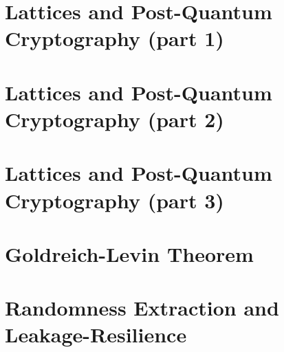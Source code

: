 \documentclass{llncs}
\begin{document}
\section{Lattices and Post-Quantum Cryptography (part 1)}

\section{Lattices and Post-Quantum Cryptography (part 2)}

\section{Lattices and Post-Quantum Cryptography (part 3)}

\section{Goldreich-Levin Theorem}

\section{Randomness Extraction and Leakage-Resilience}


\printbibliography %
\end{document}
